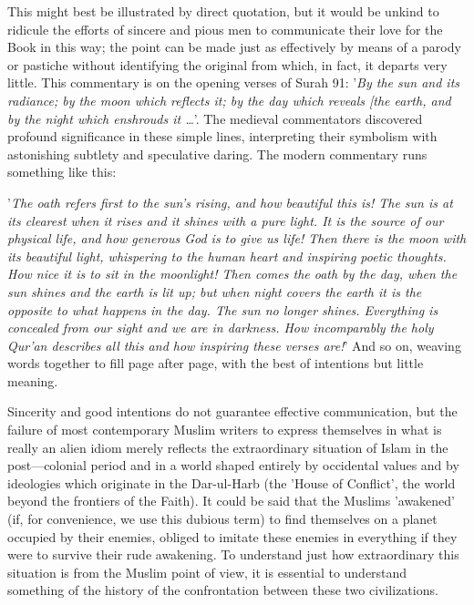 \documentclass[11pt, b5paper, twoside]{book}
\begin{document}
This might best be illustrated by direct quotation, but it would be unkind to ridicule the efforts of sincere and pious men to communicate their love for the Book in this way; the point can be made just as effectively by means of a parody or pastiche without identifying the original from which, in fact, it departs very little. This commentary is on the opening verses of Surah 91: '\emph{By the sun and its radiance; by the moon which reflects it; by the day which reveals [the earth, and by the night which enshrouds it \ldots{}}'. The medieval commentators discovered profound significance in these simple lines, interpreting their symbolism with astonishing subtlety and speculative daring. The modern commentary runs something like this:

'\emph{The oath refers first to the sun's rising, and how beautiful this is! The sun is at its clearest when it rises and it shines with a pure light. It is the source of our physical life, and how generous God is to give us life! Then there is the moon with its beautiful light, whispering to the human heart and inspiring poetic thoughts. How nice it is to sit in the moonlight! Then comes the oath by the day, when the sun shines and the earth is lit up; but when night covers the earth it is the opposite to what happens in the day. The sun no longer shines. Everything is concealed from our sight and we are in darkness. How incomparably the holy Qur'an describes all this and how inspiring these verses are!}' And so on, weaving words together to fill page after page, with the best of intentions but little meaning. 

Sincerity and good intentions do not guarantee effective communication, but the failure of most contemporary Muslim writers to express themselves in what is really an alien idiom merely reflects the extraordinary situation of Islam in the post---colonial period and in a world shaped entirely by occidental values and by ideologies which originate in the Dar-ul-Harb (the 'House of Conflict', the world beyond the frontiers of the Faith). It could be said that the Muslims 'awakened' (if, for convenience, we use this dubious term) to find themselves on a planet occupied by their enemies, obliged to imitate these enemies in everything if they were to survive their rude awakening. To understand just how extraordinary this situation is from the Muslim point of view, it is essential to understand something of the history of the confrontation between these two civilizations. \\
\end{document}
